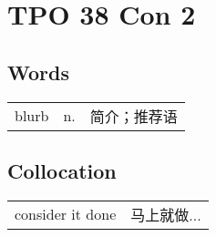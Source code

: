 \section{TPO 38 Con 2}

\subsection{Words}

\begin{tabular}{lll}
    blurb & n. & 简介；推荐语 \\
\end{tabular}

\subsection{Collocation}

\begin{tabular}{ll}
    consider it done & 马上就做... \\
\end{tabular}
